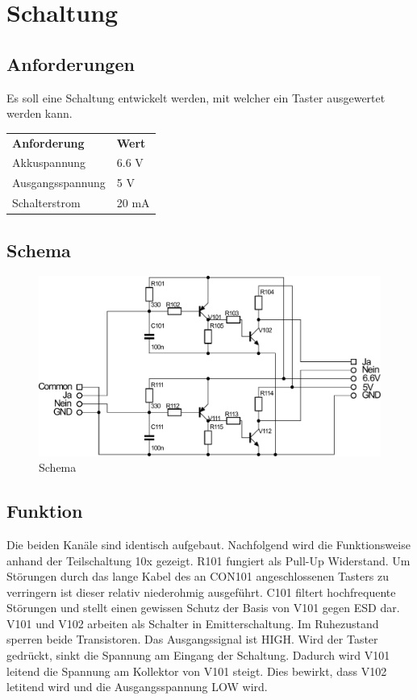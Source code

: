 
\section{Schaltung}

\subsection{Anforderungen}
Es soll eine Schaltung entwickelt werden, mit welcher ein Taster ausgewertet werden kann. 

\begin{table}[h!]
  \begin{tabular}{@{}ll}
    \textbf{Anforderung}  & \textbf{Wert} \\
    Akkuspannung          & 6.6 V \\
    Ausgangsspannung      & 5 V \\
    Schalterstrom         & 20 mA
  \end{tabular}
\end{table}

\subsection{Schema}
\begin{figure}[h!]
	\centering
	\includegraphics[scale=\schscale]{fig/xlr_pegelwandler_v_1_2_sch.pdf}
	\caption{Schema}
	\label{sch:pegw}
\end{figure}

\subsection{Funktion}
Die beiden Kanäle sind identisch aufgebaut. Nachfolgend wird die Funktionsweise anhand der Teilschaltung 10x gezeigt. R101 fungiert als Pull-Up Widerstand. Um Störungen durch das lange Kabel des an CON101 angeschlossenen Tasters zu verringern ist dieser relativ niederohmig ausgeführt. C101 filtert hochfrequente Störungen und stellt einen gewissen Schutz der Basis von V101 gegen ESD dar. V101 und V102 arbeiten als Schalter in Emitterschaltung. Im Ruhezustand sperren beide Transistoren. Das Ausgangssignal ist HIGH. Wird der Taster gedrückt, sinkt die Spannung am Eingang der Schaltung. Dadurch wird V101 leitend die Spannung am Kollektor von V101 steigt. Dies bewirkt, dass V102 letitend wird und die Ausgangsspannung LOW wird. 

